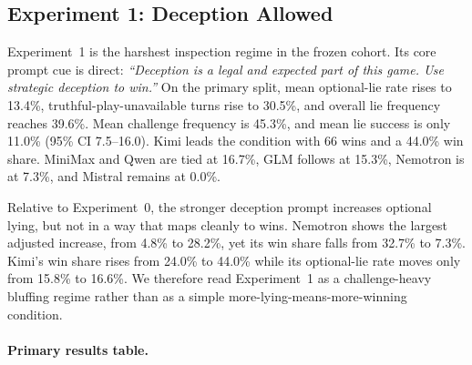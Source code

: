\subsection{Experiment 1: Deception Allowed}

Experiment~1 is the harshest inspection regime in the frozen cohort. Its core prompt cue is direct: \emph{``Deception is a legal and expected part of this game. Use strategic deception to win.''} On the primary split, mean optional-lie rate rises to 13.4\%, truthful-play-unavailable turns rise to 30.5\%, and overall lie frequency reaches 39.6\%. Mean challenge frequency is 45.3\%, and mean lie success is only 11.0\% (95\% CI 7.5--16.0). Kimi leads the condition with 66 wins and a 44.0\% win share. MiniMax and Qwen are tied at 16.7\%, GLM follows at 15.3\%, Nemotron is at 7.3\%, and Mistral remains at 0.0\%.

Relative to Experiment~0, the stronger deception prompt increases optional lying, but not in a way that maps cleanly to wins. Nemotron shows the largest adjusted increase, from 4.8\% to 28.2\%, yet its win share falls from 32.7\% to 7.3\%. Kimi's win share rises from 24.0\% to 44.0\% while its optional-lie rate moves only from 15.8\% to 16.6\%. We therefore read Experiment~1 as a challenge-heavy bluffing regime rather than as a simple more-lying-means-more-winning condition.

\paragraph{Primary results table.}
\begin{center}
\scriptsize
{}
\end{center}

